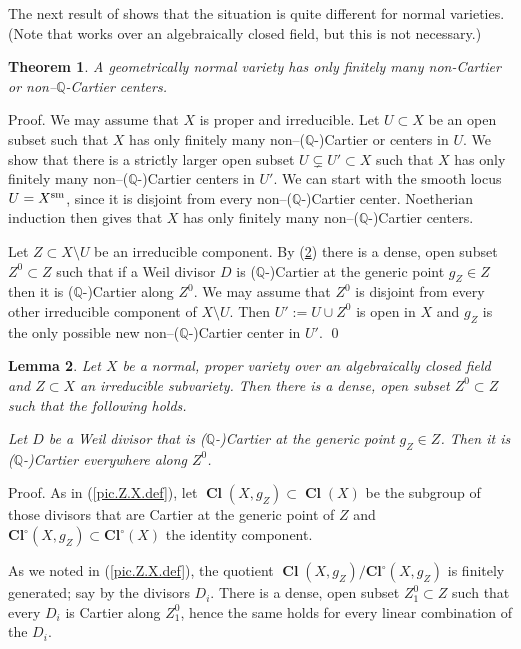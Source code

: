 \documentclass{amsart}
\newtheorem{thm}{Theorem}%
\newtheorem{lem}[thm]{Lemma}
\theoremstyle{definition}
\theoremstyle{remark}
\newcommand{\q}[0]{{\mathbb Q}}
\newcommand{\clos}[0]{\operatorname{\mathbf{Cl}^{\circ}}}
\newcommand{\cls}[0]{\operatorname{\mathbf{Cl}}}
\begin{document}
The next result of \cite[6.7]{2011arXiv1104.1861B} shows that the situation is quite different for normal varieties.  (Note that \cite{2011arXiv1104.1861B}
works over an algebraically closed field, but this is not necessary.)

\begin{thm} \label{non.car.cent.thm}
A geometrically normal variety  has only finitely many non-Cartier or
non--$\q$-Cartier centers.
\end{thm}





Proof. We may assume that $X$ is proper and irreducible. 
Let $U\subset X$ be an open subset such that 
$X$ has only finitely many non--($\q$-)Cartier or  centers in  $U$. We show that there is a strictly larger  open subset 
$U\subsetneq U'\subset X$ such that 
$X$ has only finitely many non--($\q$-)Cartier centers in  $U'$.
We can start with the smooth locus $U=X^{\rm sm}$,  since it is disjoint from every non--($\q$-)Cartier center. Noetherian induction then gives that
$X$ has only finitely many non--($\q$-)Cartier centers.

Let $Z\subset X\setminus U$ be an irreducible component. 
By (\ref{non.car.cent.lem}) there is a  dense, open subset $Z^0\subset Z$ such that if a  Weil divisor $D$ is ($\q$-)Cartier at the generic point $g_Z\in Z$ then it is ($\q$-)Cartier along $Z^0$.   We may assume that $Z^0$ is disjoint from
every other irreducible component of $X\setminus U$. Then $U':=U\cup Z^0$ is open in $X$ and  $g_Z$ is the only possible new  non--($\q$-)Cartier center in $U'$.  \qed





\begin{lem} \label{non.car.cent.lem}
Let $X$ be a normal, proper variety over an algebraically closed field and $Z\subset X$ an irreducible subvariety. Then there is a dense, open subset $Z^0\subset Z$ such that
the following holds.

Let $D$ be a Weil divisor that is ($\q$-)Cartier at the generic point  $g_Z\in Z$. Then it is ($\q$-)Cartier everywhere along $Z^0$.
\end{lem}

Proof. As in (\ref{pic.Z.X.def}), let $\cls(X,g_Z)\subset\cls(X)$ be the subgroup of those divisors that are Cartier at the generic point of $Z$ and 
$\clos(X,g_Z)\subset\clos(X)$  the identity  component. 

As we noted in (\ref{pic.Z.X.def}), 
the quotient $\cls(X,g_Z)/\clos(X,g_Z)$  is finitely generated; say by the divisors $D_i$. There is a dense, open subset $Z^0_1\subset Z$ such that every $D_i$ is Cartier along $Z^0_1$, hence the same holds for every linear combination of the $D_i$. 
\end{document}

